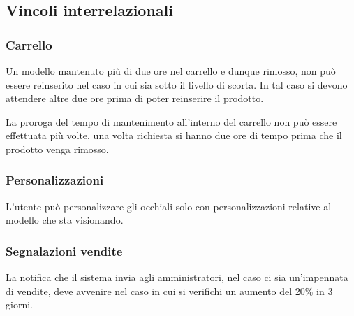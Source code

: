 \documentclass[12pt, a4paper]{article}
\begin{document}
\subsection{Vincoli interrelazionali}
\subsubsection{Carrello}
Un modello mantenuto più di due ore nel carrello e dunque rimosso, non può essere reinserito nel
caso in cui sia sotto il livello di scorta. In tal caso si devono attendere altre due ore prima di
poter reinserire il prodotto.

La proroga del tempo di mantenimento all'interno del carrello non può essere effettuata più volte,
una volta richiesta si hanno due ore di tempo prima che il prodotto venga rimosso.

\subsubsection{Personalizzazioni}
L'utente può personalizzare gli occhiali solo con personalizzazioni relative al modello che sta
visionando.

\subsubsection{Segnalazioni vendite}
La notifica che il sistema invia agli amministratori, nel caso ci sia un'impennata di vendite,
deve avvenire nel caso in cui si verifichi un aumento del 20\% in 3 giorni.
\end{document}
